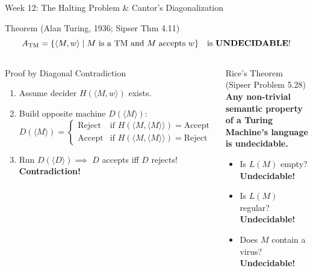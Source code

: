 \documentclass[aspectratio=169,10pt]{beamer}
\begin{document}
\begin{frame}{Week 12: The Halting Problem \& Cantor's Diagonalization}
    \begin{block}{Theorem (Alan Turing, 1936; Sipser Thm 4.11)}
        $$A_{\text{TM}} = \{\langle M, w \rangle \mid M \text{ is a TM and } M \text{ accepts } w\} \quad \text{is \textbf{UNDECIDABLE}!}$$
    \end{block}
    
    \begin{columns}[T]
        \begin{alertblock}{Proof by Diagonal Contradiction}
            \begin{enumerate}\small
                \item Assume decider $H(\langle M, w \rangle)$ exists.
                \item Build opposite machine $D(\langle M \rangle)$:
                $$D(\langle M \rangle) = \begin{cases} \text{Reject} & \text{if } H(\langle M, \langle M \rangle \rangle) = \text{Accept} \\ \text{Accept} & \text{if } H(\langle M, \langle M \rangle \rangle) = \text{Reject} \end{cases}$$
                \item Run $D(\langle D \rangle) \implies$ $D$ accepts iff $D$ rejects! \textbf{Contradiction!}
            \end{enumerate}
        \end{alertblock}
        
        \begin{exampleblock}{Rice's Theorem (Sipser Problem 5.28)}
            \textbf{Any non-trivial semantic property of a Turing Machine's language is undecidable.}
            \begin{itemize}\small
                \item Is $L(M)$ empty? \textbf{Undecidable!}
                \item Is $L(M)$ regular? \textbf{Undecidable!}
                \item Does $M$ contain a virus? \textbf{Undecidable!}
            \end{itemize}
        \end{exampleblock}
    \end{columns}
\end{frame}
\end{document}
